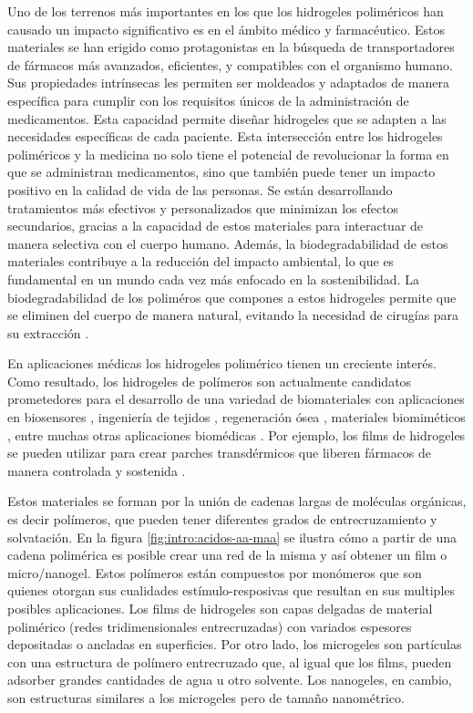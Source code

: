  Uno de los terrenos m\'as importantes en los que los hidrogeles polim\'ericos han causado un impacto significativo es en el \'ambito m\'edico y farmac\'eutico. Estos materiales se han erigido como protagonistas en la b\'usqueda de transportadores de f\'armacos m\'as avanzados, eficientes, y compatibles con el organismo humano. Sus propiedades intr\'insecas les permiten ser moldeados y adaptados de manera espec\'ifica para cumplir con los requisitos \'unicos de la administraci\'on de medicamentos.
Esta capacidad permite dise\~nar hidrogeles  que se adapten a las necesidades espec\'ificas de cada paciente.
Esta intersecci\'on entre los hidrogeles polim\'ericos y la medicina no solo tiene el potencial de revolucionar la forma en que se administran medicamentos, sino que tambi\'en puede tener un impacto positivo en la calidad de vida de las personas. Se est\'an desarrollando tratamientos m\'as efectivos y personalizados que minimizan los efectos secundarios, gracias a la capacidad de estos materiales para interactuar de manera selectiva con el cuerpo humano. Adem\'as, la biodegradabilidad de estos materiales contribuye a la reducci\'on del impacto ambiental, lo que es fundamental en un mundo cada vez m\'as enfocado en la sostenibilidad.
La biodegradabilidad de los polim\'eros que compones a estos hidrogeles permite que se eliminen del cuerpo de manera natural, evitando la necesidad de cirug\'ias para su extracci\'on \cite{samir2022recent}.

En aplicaciones m\'edicas los hidrogeles polim\'erico tienen  un creciente inter\'es. 
Como resultado, los hidrogeles de pol\'imeros son actualmente candidatos prometedores para el desarrollo de una variedad de biomateriales con aplicaciones en biosensores \cite{zhang2012ultrathin,islam2014responsive}, ingenier\'ia de tejidos \cite{matricardi2013interpenetrating,van2011biopolymer}, regeneraci\'on \'osea \cite{bai2018bioactive}, materiales biomim\'eticos \cite{green2016mimicking,wu2010multifunctional}, entre muchas otras aplicaciones biom\'edicas \cite{Daly2020}.
Por ejemplo, los films de  hidrogeles se pueden utilizar para crear parches transd\'ermicos que liberen f\'armacos de manera controlada y sostenida  \cite{indulekha2016thermoresponsive}.

Estos materiales se forman por la uni\'on de cadenas largas de mol\'eculas org\'anicas, es decir pol\'imeros, que pueden tener diferentes grados de entrecruzamiento y solvataci\'on. En la figura \ref{fig:intro:acidos-aa-maa} se ilustra c\'omo a partir de una cadena polim\'erica es posible crear una red de la misma y as\'i obtener un film o micro/nanogel. Estos pol\'imeros est\'an compuestos por mon\'omeros que son quienes otorgan sus cualidades est\'imulo-resposivas que resultan en sus multiples posibles aplicaciones.
Los films de hidrogeles son capas delgadas de material polim\'erico (redes tridimensionales entrecruzadas) con variados espesores depositadas o ancladas en superficies. Por otro lado, los microgeles son part\'iculas con una estructura de pol\'imero entrecruzado que, al igual que los films, pueden adsorber grandes cantidades de agua u otro solvente. Los nanogeles, en cambio, son estructuras similares a los microgeles pero de tama\~no nanom\'etrico.

